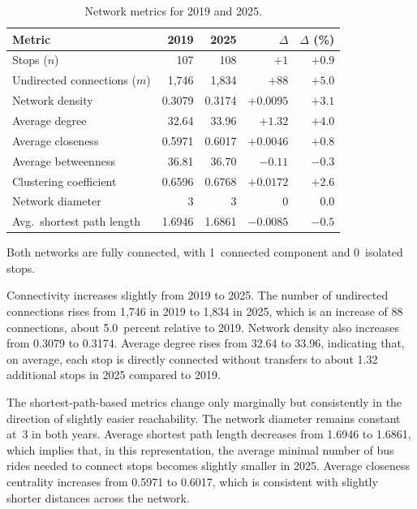 \documentclass[12pt,a4paper,oneside]{report}
\begin{document}
\begin{table}[htbp]
  \centering
  \caption{Network metrics for 2019 and 2025.}\label{tab:metrics}
  \begin{tabular}{@{} l r r r r @{}}
    \toprule
    Metric & 2019 & 2025 & $\Delta$ & $\Delta$ (\%) \\
    \midrule
    Stops ($n$)                 & 107     & 108     & $+1$      & $+0.9$  \\
    Undirected connections ($m$)& 1{,}746 & 1{,}834 & $+88$     & $+5.0$  \\
    Network density             & 0.3079  & 0.3174  & $+0.0095$ & $+3.1$  \\
    Average degree              & 32.64   & 33.96   & $+1.32$   & $+4.0$  \\
    Average closeness           & 0.5971  & 0.6017  & $+0.0046$ & $+0.8$  \\
    Average betweenness         & 36.81   & 36.70   & $-0.11$   & $-0.3$  \\
    Clustering coefficient      & 0.6596  & 0.6768  & $+0.0172$ & $+2.6$  \\
    Network diameter            & 3       & 3       & 0         & $0.0$   \\
    Avg.\ shortest path length  & 1.6946  & 1.6861  & $-0.0085$ & $-0.5$  \\
    \bottomrule
  \end{tabular}
  \par\smallskip
  \footnotesize Both networks are fully connected, with 1~connected component and 0~isolated stops.
\end{table}

Connectivity increases slightly from 2019 to 2025.
The number of undirected connections rises from 1,746 in 2019 to 1,834 in 2025, which is an increase of 88 connections, about 5.0~percent relative to 2019.
Network density also increases from 0.3079 to 0.3174.
Average degree rises from 32.64 to 33.96, indicating that, on average, each stop is directly connected without transfers to about 1.32 additional stops in 2025 compared to 2019.

The shortest-path-based metrics change only marginally but consistently in the direction of slightly easier reachability.
The network diameter remains constant at~3 in both years.
Average shortest path length decreases from 1.6946 to 1.6861, which implies that, in this representation, the average minimal number of bus rides needed to connect stops becomes slightly smaller in 2025.
Average closeness centrality increases from 0.5971 to 0.6017, which is consistent with slightly shorter distances across the network.
\end{document}
